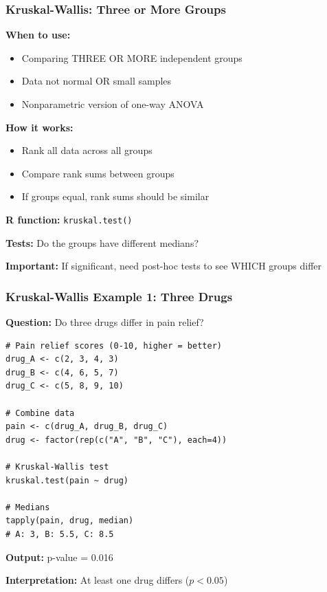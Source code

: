 \documentclass{beamer}
\begin{document}
\begin{frame}
\frametitle{Kruskal-Wallis: Three or More Groups}
\textbf{When to use:}
\begin{itemize}
\item Comparing THREE OR MORE independent groups
\item Data not normal OR small samples
\item Nonparametric version of one-way ANOVA
\end{itemize}

\vspace{0.5cm}
\textbf{How it works:}
\begin{itemize}
\item Rank all data across all groups
\item Compare rank sums between groups
\item If groups equal, rank sums should be similar
\end{itemize}

\vspace{0.5cm}
\textbf{R function:} \texttt{kruskal.test()}

\textbf{Tests:} Do the groups have different medians?

\vspace{0.3cm}
\textbf{Important:} If significant, need post-hoc tests to see WHICH groups differ
\end{frame}

\begin{frame}[fragile]
\frametitle{Kruskal-Wallis Example 1: Three Drugs}
\textbf{Question:} Do three drugs differ in pain relief?

\vspace{0.2cm}
\begin{footnotesize}
\begin{verbatim}
# Pain relief scores (0-10, higher = better)
drug_A <- c(2, 3, 4, 3)
drug_B <- c(4, 6, 5, 7)
drug_C <- c(5, 8, 9, 10)

# Combine data
pain <- c(drug_A, drug_B, drug_C)
drug <- factor(rep(c("A", "B", "C"), each=4))

# Kruskal-Wallis test
kruskal.test(pain ~ drug)

# Medians
tapply(pain, drug, median)
# A: 3, B: 5.5, C: 8.5
\end{verbatim}
\end{footnotesize}

\textbf{Output:} p-value = 0.016

\textbf{Interpretation:} At least one drug differs ($p < 0.05$)
\end{frame}
\end{document}
